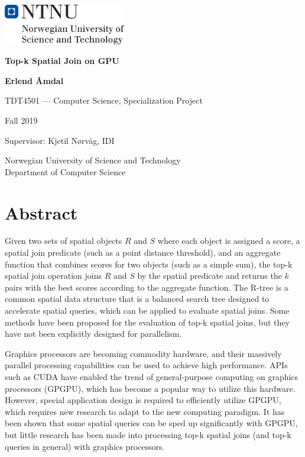 \documentclass[12pt]{report}
\begin{document}
\begin{titlepage}
    \sffamily
    \setlength{\parindent}{0pt}
    \includegraphics[width=0.4\textwidth]{ntnu}

    \vspace*{2cm}

    \Huge
    \textbf{Top-k Spatial Join on GPU}

    \vspace{0.5cm}
    \LARGE

    \vspace{1.5cm}

    \textbf{Erlend Åmdal}

    \vfill

    \large
    TDT4501 --- Computer Science, Specialization Project

    Fall 2019

    \vspace{1cm}

    Supervisor: Kjetil Nørvåg, IDI

    \vspace{1cm}
    Norwegian University of Science and Technology\\
    Department of Computer Science
\end{titlepage}

\chapter*{Abstract}
Given two sets of spatial objects \(R\) and \(S\) where each object is assigned a score, a spatial join predicate (such as a point distance threshold), and an aggregate function that combines scores for two objects (such as a simple sum), the top-k spatial join operation joins \(R\) and \(S\) by the spatial predicate and returns the \(k\) pairs with the best scores according to the aggregate function. The R-tree is a common spatial data structure that is a balanced search tree designed to accelerate spatial queries, which can be applied to evaluate spatial joins. Some methods have been proposed for the evaluation of top-k spatial joins, but they have not been explicitly designed for parallelism.

Graphics processors are becoming commodity hardware, and their massively parallel processing capabilities can be used to achieve high performance. APIs such as CUDA have enabled the trend of general-purpose computing on graphics processors (GPGPU), which has become a popular way to utilize this hardware. However, special application design is required to efficiently utilize GPGPU, which requires new research to adapt to the new computing paradigm. It has been shown that some spatial queries can be sped up significantly with GPGPU, but little research has been made into processing top-k spatial joins (and top-k queries in general) with graphics processors.
\end{document}
